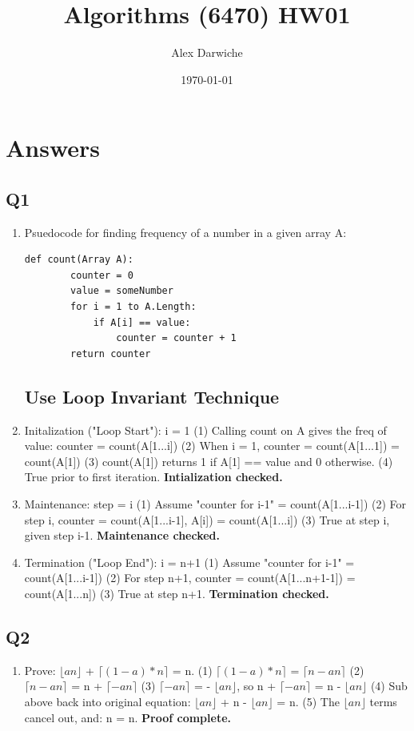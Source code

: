 \documentclass{article}
\title{Algorithms (6470) HW01}
\author{Alex Darwiche}
\date{\today}
\newcommand\floor[1]{\lfloor#1\rfloor}
\newcommand\ceil[1]{\lceil#1\rceil}
\begin{document}
\maketitle

\section*{Answers}

\subsection*{Q1}
\begin{enumerate}[label=(\alph*)]
    \item Psuedocode for finding frequency of a number in a given array A:
    \begin{lstlisting}[frame=single]
    def count(Array A):
        counter = 0
        value = someNumber
        for i = 1 to A.Length:
            if A[i] == value:
                counter = counter + 1
        return counter

    \end{lstlisting}
    \subsection*{Use Loop Invariant Technique}
    \item Initalization ("Loop Start"): i = 1
    \subitem (1) Calling count on A gives the freq of value: counter = count(A[1...i])
    \subitem (2) When i = 1, counter = count(A[1...1]) = count(A[1])
    \subitem (3) count(A[1]) returns 1 if A[1] == value and 0 otherwise.
    \subitem (4) True prior to first iteration. \textbf{Intialization checked.}

    \item Maintenance: step = i
    \subitem (1) Assume "counter for i-1" = count(A[1...i-1])
    \subitem (2) For step i, counter = count(A[1...i-1], A[i]) = count(A[1...i])
    \subitem (3) True at step i, given step i-1. \textbf{Maintenance checked.}

    \item Termination ("Loop End"): i = n+1
    \subitem (1) Assume "counter for i-1" = count(A[1...i-1])
    \subitem (2) For step n+1, counter = count(A[1...n+1-1]) = count(A[1...n])
    \subitem (3) True at step n+1. \textbf{Termination checked.}
\end{enumerate}

\subsection*{Q2}
\begin{enumerate}[label=(\alph*)]
    \item Prove: $\floor{an}$ + $\ceil{(1-a)*n}$ = n.
    \subitem (1) $\ceil{(1-a)*n}$ = $\ceil{n-an}$
    \subitem (2) $\ceil{n-an}$ = n + $\ceil{-an}$
    \subitem (3) $\ceil{-an}$ = - $\floor{an}$, so n + $\ceil{-an}$ = n - $\floor{an}$
    \subitem (4) Sub above back into original equation: $\floor{an}$ + n - $\floor{an}$ = n.
    \subitem (5) The $\floor{an}$ terms cancel out, and: n = n. \textbf{Proof complete.}
\end{enumerate}
\end{document}
